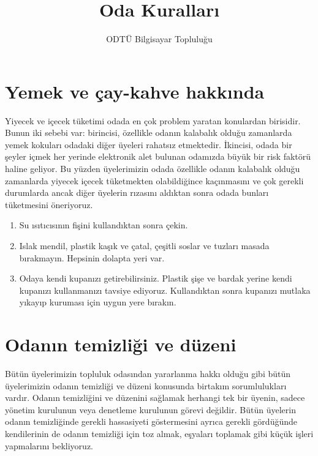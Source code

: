\documentclass{article}
\title{Oda Kuralları}
\author{ODTÜ Bilgisayar Topluluğu}
\begin{document}
\maketitle

\section{Yemek ve çay-kahve hakkında}

Yiyecek ve içecek tüketimi odada en çok problem yaratan konulardan birisidir. Bunun iki sebebi var: birincisi, özellikle odanın kalabalık olduğu zamanlarda yemek kokuları odadaki diğer üyeleri rahatsız etmektedir. İkincisi, odada bir şeyler içmek her yerinde elektronik alet bulunan odamızda büyük bir risk faktörü haline geliyor. Bu yüzden üyelerimizin odada özellikle odanın kalabalık olduğu zamanlarda yiyecek içecek tüketmekten olabildiğince kaçınmasını ve çok gerekli durumlarda ancak diğer üyelerin rızasını aldıktan sonra odada bunları tüketmesini öneriyoruz.

\begin{enumerate}
	\item Su ısıtıcısının fişini kullandıktan sonra çekin.
	\item Islak mendil, plastik kaşık ve çatal, çeşitli soslar ve tuzları masada bırakmayın. Hepsinin dolapta yeri var. 
	\item Odaya kendi kupanızı getirebilirsiniz. Plastik şişe ve bardak yerine kendi kupanızı kullanmanızı tavsiye ediyoruz. Kullandıktan sonra kupanızı mutlaka yıkayıp kuruması için uygun yere bırakın.
\end{enumerate}

\section{Odanın temizliği ve düzeni}

Bütün üyelerimizin topluluk odasından yararlanma hakkı olduğu gibi bütün üyelerimizin odanın temizliği ve düzeni konusunda birtakım sorumlulukları vardır. Odanın temizliğini ve düzenini sağlamak herhangi tek bir üyenin, sadece yönetim kurulunun veya denetleme kurulunun görevi değildir. Bütün üyelerin odanın temizliğinde gerekli hassasiyeti göstermesini ayrıca gerekli gördüğünde kendilerinin de odanın temizliği için toz almak, eşyaları toplamak gibi küçük işleri yapmalarını bekliyoruz.
\end{document}
